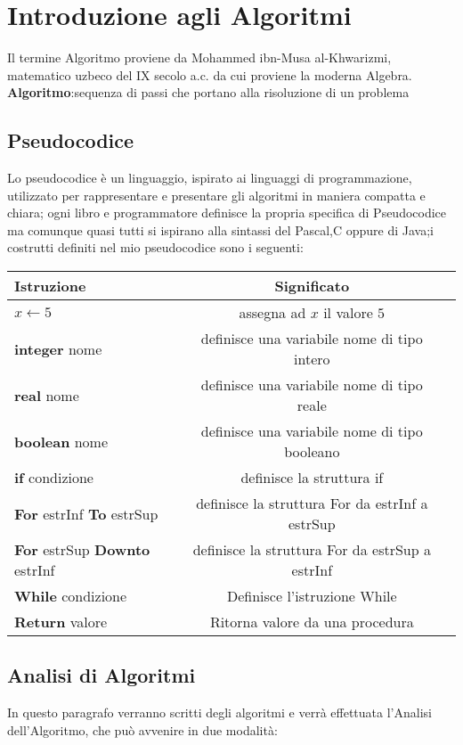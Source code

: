 \chapter{Introduzione agli Algoritmi}
Il termine Algoritmo proviene da Mohammed ibn-Musa al-Khwarizmi, matematico uzbeco
del IX secolo a.c. da cui proviene la moderna Algebra. \newline%
\textbf{Algoritmo}:sequenza di passi che portano alla risoluzione di un problema

\section{Pseudocodice}
Lo pseudocodice è un linguaggio, ispirato ai linguaggi di programmazione, utilizzato
per rappresentare e presentare gli algoritmi in maniera compatta e chiara;
ogni libro e programmatore definisce la propria specifica di Pseudocodice ma comunque
quasi tutti si ispirano alla sintassi del Pascal,C oppure di Java;i costrutti definiti
nel mio pseudocodice sono i seguenti:

\begin{tabular}{lcr}
  \toprule Istruzione & Significato\\
  \midrule
  $x \gets 5$ & assegna ad $x$ il valore $5$\\
  \textbf{integer} nome & definisce una variabile nome di tipo intero\\
  \textbf{real} nome & definisce una variabile nome di tipo reale\\
  \textbf{boolean} nome & definisce una variabile nome di tipo booleano\\
  \textbf{if} condizione & definisce la struttura if\\
  \textbf{For} estrInf \textbf{To} estrSup & definisce la struttura For da estrInf a estrSup \\
  \textbf{For} estrSup \textbf{Downto} estrInf & definisce la struttura For da estrSup a estrInf\\
  \textbf{While} condizione & Definisce l'istruzione While\\
  \textbf{Return} valore & Ritorna valore da una procedura\\
  \bottomrule
\end{tabular}

\section{Analisi di Algoritmi}
In questo paragrafo verranno scritti degli algoritmi e verrà effettuata l'Analisi
dell'Algoritmo, che può avvenire in due modalità:

